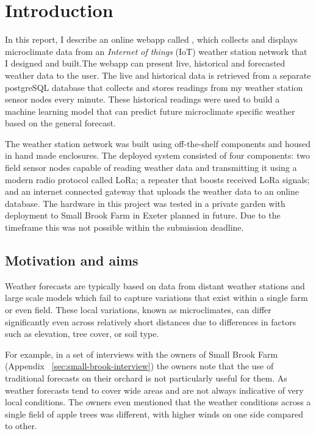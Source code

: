 \section{Introduction}

In this report, I describe an online webapp called \myReportTitle{}, which
collects and displays microclimate data from an \emph{Internet of things} (IoT)
weather station network that I designed and built.The webapp can present live,
historical and forecasted weather data to the user. The live and historical data
is retrieved from a separate postgreSQL database that collects and stores
readings from my weather station sensor nodes every minute. These historical
readings were used to build a machine learning model that can predict future
microclimate specific weather based on the general forecast.

The weather station network was built using off-the-shelf components and housed
in hand made enclosures. The deployed system consisted of four components: two
field sensor nodes capable of reading weather data and transmitting it using a
modern radio protocol called LoRa; a repeater that boosts received LoRa signals;
and an internet connected gateway that uploads the weather data to an online
database. The hardware in this project was tested in a private garden with
deployment to Small Brook Farm in Exeter planned in future. Due to the timeframe
this was not possible within the submission deadline.

\subsection{Motivation and aims}

Weather forecasts are typically based on data from distant weather stations and
large scale models which fail to capture variations that exist within a single
farm or even field. These local variations, known as microclimates, can differ
significantly even across relatively short distances due to differences in
factors such as elevation, tree cover, or soil type. 

For example, in a set of interviews with the owners of Small Brook Farm
(Appendix ~\ref{sec:small-brook-interview}) the owners note that the use of
traditional forecasts on their orchard is not particularly useful for them. As
weather forecasts tend to cover wide areas and are not always indicative of very
local conditions. The owners even mentioned that the weather conditions across a
single field of apple trees was different, with higher winds on one side
compared to other. 

